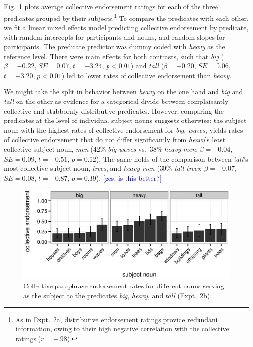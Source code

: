 \documentclass[linguex]{sp}
\newcommand{\ndg}[1]{\textcolor{Green}{[ndg: #1]}}
\newcommand{\gcs}[1]{\textcolor{blue}{[gcs: #1]}}
\begin{document}

Fig.~\ref{bhtcoll} plots average collective endorsement ratings for each of the three predicates grouped by their subjects.\footnote{As in Expt.~2a, distributive endorsement ratings provide redundant information, owing to their high negative correlation with the collective ratings ($r=-.98$).}
%
%
To compare the predicates with each other, we fit a linear mixed effects model predicting collective endorsement by predicate, with random intercepts for participants and nouns, and random slopes for participants. The predicate predictor was dummy coded with \emph{heavy} as the reference level. There were main effects for both contrasts, such that \emph{big} ($\beta=-0.22$, $SE=0.07$, $t=-3.24$, $p<0.01$) and \emph{tall} ($\beta=-0.20$, $SE=0.06$, $t=-3.20$, $p<0.01$) led to lower rates of collective endorsement than \emph{heavy}. 

We might take the split in behavior between \emph{heavy} on the one hand and \emph{big} and \emph{tall} on the other as evidence for a categorical divide between complaisantly collective and stubbornly distributive predicates. However, comparing the predicates at the level of individual subject nouns suggests otherwise: the subject noun with the highest rates of collective endorsement for \emph{big}, \emph{waves}, yields rates of collective endorsement that do not differ significantly from \emph{heavy}'s least collective subject noun, \emph{men} (42\% \emph{big waves} vs.~38\% \emph{heavy men}; $\beta=-0.04$, $SE=0.09$, $t=-0.51$, $p=0.62$). The same holds of the comparison between \emph{tall}'s most collective subject noun, \emph{trees}, and \emph{heavy men} (30\% \emph{tall trees}; $\beta=-0.07$, $SE=0.08$, $t=-0.87$, $p=0.39$). \gcs{is this better?}
%

\begin{figure}[htb]
	\centering
	\includegraphics[width=.85\linewidth]{plots/bht_plot.eps}
	\vspace{0pt}
	\caption{Collective paraphrase endorsement rates for different nouns serving as the subject to the predicates \emph{big}, \emph{heavy}, and \emph{tall} (Expt.~2b).} \label{bhtcoll}
\end{figure}
\end{document}
